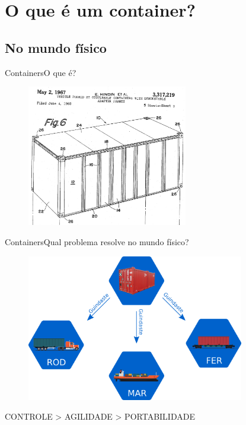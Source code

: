\section{O que é um container?}
\subsection{No mundo físico}
\begin{frame}{Containers}{O que é?}
  \begin{figure}[ht!]
    \centering
    \includegraphics[width=70mm]{images/container_patent.png}
  \end{figure}
\end{frame}

\begin{frame}{Containers}{Qual problema resolve no mundo físico?}
  \begin{figure}[ht!]
    \centering
    \includegraphics[width=95mm]{images/container_intermodal.png}
  \end{figure}
  \begin{center}
    CONTROLE > AGILIDADE > PORTABILIDADE
  \end{center}
\end{frame}

